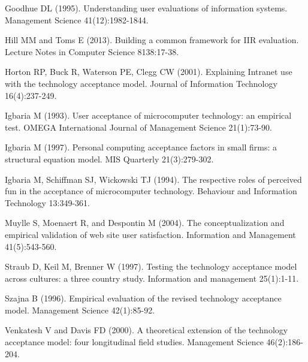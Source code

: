 \documentclass[11pt]{article}
\begin{document}
Goodhue DL (1995). Understanding user evaluations of information systems. Management Science 41(12):1982-1844.

Hill MM and Toms E (2013). Building a common framework for IIR evaluation. Lecture Notes in Computer Science 8138:17-38.

Horton RP, Buck R, Waterson PE, Clegg CW (2001). Explaining Intranet use with the technology acceptance model. Journal of Information Technology 16(4):237-249.

Igbaria M (1993). User acceptance of microcomputer technology: an empirical test. OMEGA International Journal of Management Science 21(1):73-90. 

Igbaria M (1997). Personal computing acceptance factors in small firms: a structural equation model. MIS Quarterly 21(3):279-302.

Igbaria M, Schiffman SJ, Wickowski TJ (1994). The respective roles of perceived fun in the acceptance of microcomputer technology. Behaviour and  Information Technology 13:349-361. 

Muylle S, Moenaert R, and Despontin M (2004). The conceptualization and empirical validation of web site user satisfaction. Information and Management 41(5):543-560.

Straub D, Keil M, Brenner W (1997). Testing the technology acceptance model across cultures: a three country study. Information and management 25(1):1-11.

Szajna B (1996). Empirical evaluation of the revised technology acceptance model. Management Science 42(1):85-92. 

Venkatesh V and Davis FD (2000). A theoretical extension of the technology acceptance model: four longitudinal field studies. Management Science 46(2):186-204.
\fi


%
%
\end{document}

